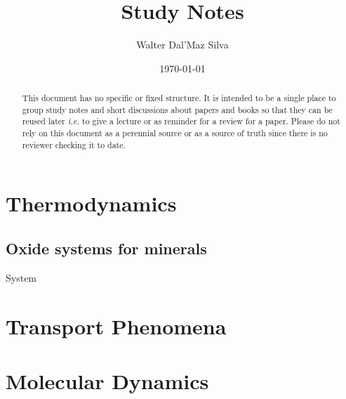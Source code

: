 \documentclass[12pt]{paper}
\title{Study Notes}
\author{Walter Dal'Maz Silva}
\date{\today}
\begin{document}
\maketitle%
\tableofcontents%

\begin{abstract}
This document has no specific or fixed structure. It is intended to be a single place to group study notes and short discussions about papers and books so that they can be reused later \emph{i.e.} to give a lecture or as reminder for a review for a paper. Please do not rely on this document as a perennial source or as a source of truth since there is no reviewer checking it to date.
\end{abstract}

\section{Thermodynamics}

\subsection{Oxide systems for minerals}

System ~\textcite{Huang1995}

\section{Transport Phenomena}

\section{Molecular Dynamics}


\printbibliography%
\end{document}
